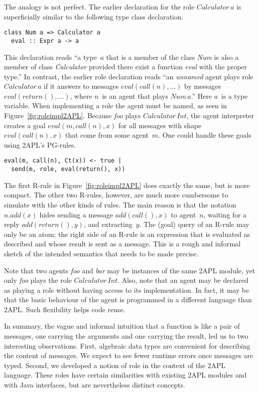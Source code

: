 \documentclass[a4paper,12pt,oneside,fleqn]{book} %
\theoremstyle{plain}
\theoremstyle{definition}
\theoremstyle{remark}
\begin{document}
The analogy is not perfect. The earlier declaration for the role
$\mathit{Calculator}\,a$ is superficially similar to the following type
class declaration.
\begin{verbatim}
class Num a => Calculator a
  eval :: Expr a -> a
\end{verbatim}
This declaration reads ``a type~$a$ that is a member of the class
\textit{Num} is also a member of class \textit{Calculator} provided there
exist a function \textit{eval} with the proper type.'' In contrast, the
earlier role declaration reads ``an \emph{unnamed} agent plays role
$\mathit{Calculator}\,a$ if it answers to messages
$\mathit{eval}(\mathit{call}(n),\ldots)$ by messages
$\mathit{eval}(\mathit{return}(),\ldots)$, where $n$~is an agent that plays
$\mathit{Num}\,a$.'' Here $a$~is a type variable.  When implementing a role
the agent must be named, as seen in Figure~\ref{fig:roleimpl2APL}. Because
\textit{foo} plays $\mathit{Calculator}\,\mathit{Int}$, the agent
interpreter creates a goal $\mathit{eval}(m,\mathit{call}(n),x)$ for all
messages with shape $\mathit{eval}(\mathit{call}(n),x)$ that come from some
agent~$m$.  One could handle these goals using 2APL's PG-rules.
\begin{verbatim}
eval(m, call(n), Ct(x)) <- true |
  send(m, role, eval(return(), x))
\end{verbatim}
The first R-rule in Figure~\ref{fig:roleimpl2APL} does exactly the same,
but is more compact. The other two R-rules, however, are much more
cumbersome to simulate with the other kinds of rules. The main reason is
that the notation $n.\mathit{add}(x)$ hides sending a message
$\mathit{add}(\mathit{call}(),x)$ to agent~$n$, waiting for a reply
$\mathit{add}(\mathit{return}(),y)$, and extracting~$y$. The (goal) query
of an R-rule may only be an atom; the right side of an R-rule is an
expression that is evaluated as described and whose result is sent as a
message.  This is a rough and informal sketch of the intended semantics
that needs to be made precise.

Note that two agents \textit{foo} and \textit{bar} may be instances of the
same 2APL module, yet only \textit{foo} plays the role
$\mathit{Calculator}\,\mathit{Int}$. Also, note that an agent may be
declared as playing a role without having access to its implementation. In
fact, it may be that the basic behaviour of the agent is programmed in a
different language than 2APL. Such flexibility helps code reuse.

In summary, the vague and informal intuition that a function is like a pair
of messages, one carrying the arguments and one carrying the result, led us
to two interesting observations. First, algebraic data types are convenient
for describing the content of messages. We expect to see fewer runtime
errors once messages are typed. Second, we developed a notion of role in
the context of the 2APL language. These roles have certain similarities
with existing 2APL modules and with Java interfaces, but are nevertheless
distinct concepts.
\end{document}
